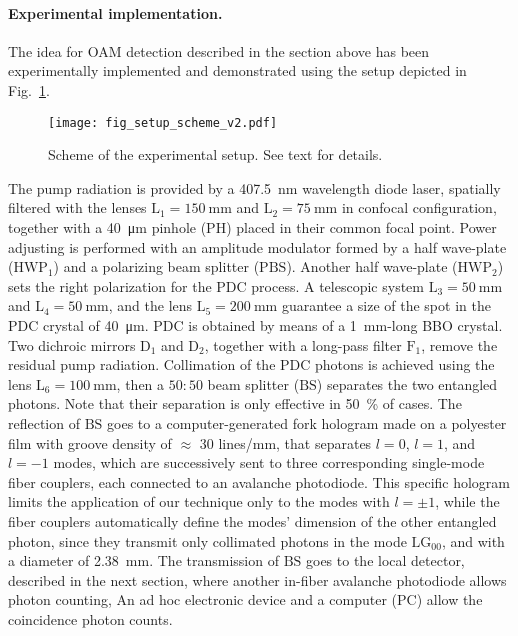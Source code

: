 \documentclass[
reprint,
amsmath,amssymb,
aps,
showkeys
]{revtex4-2}
\begin{document}
\paragraph*{\label{sec:experiment} Experimental implementation.}
The idea for OAM detection described in the section above has been experimentally implemented and demonstrated using the setup depicted in Fig.~\ref{fig:setup}.
%
\begin{figure}
\texttt{[image: fig\_setup\_scheme\_v2.pdf]}
\caption{Scheme of the experimental setup.
See text for details.}
\label{fig:setup}
\end{figure}
%
The pump radiation is provided by a \SI{407.5}{\nano\meter} wavelength diode laser, spatially filtered with the lenses $\mathrm{L}_1 = \SI{150}{\milli\meter}$ and $\mathrm{L}_2 = \SI{75}{\milli\meter}$ in confocal configuration, together with a \SI{40}{\micro\meter} pinhole ($\mathrm{PH}$) placed in their common focal point.
Power adjusting is performed with an amplitude modulator formed by a half wave-plate ($\mathrm{HWP}_1$) and a polarizing beam splitter ($\mathrm{PBS}$).
Another half wave-plate ($\mathrm{HWP}_2$) sets the right polarization for the PDC process.
A telescopic system $\mathrm{L}_3 = \SI{50}{\milli\meter}$ and $\mathrm{L}_4 = \SI{50}{\milli\meter}$, and the lens $\mathrm{L}_5 = \SI{200}{\milli\meter}$ guarantee a size of the spot in the PDC crystal of \SI{40}{\micro\meter}.
PDC is obtained by means of a \SI{1}{\milli\meter}-long BBO crystal.
Two dichroic mirrors $\mathrm{D}_1$ and $\mathrm{D}_2$, together with a long-pass filter $\mathrm{F}_1$, remove the residual pump radiation.
Collimation of the PDC photons is achieved using the lens $\mathrm{L}_6 = \SI{100}{\milli\meter}$, then a $50\!:\!50$ beam splitter ($\mathrm{BS}$) separates the two entangled photons.
Note that their separation is only effective in \SI{50}{\percent} of cases.
The reflection of $\mathrm{BS}$ goes to a computer-generated fork hologram made on a polyester film with groove density of $\approx$ 30 lines/mm, that separates $l=0$, $l=1$, and $l=-1$ modes, which are successively sent to three corresponding single-mode fiber couplers, each connected to an avalanche photodiode.
This specific hologram limits the application of our technique only to the modes with $l=\pm 1$, while the fiber couplers automatically define the modes' dimension of the other entangled photon, since they transmit only collimated photons in the mode $\mathrm{LG}_{00}$, and with a diameter of \SI{2.38}{\milli\meter}.
The transmission of $\mathrm{BS}$ goes to the local detector, described in the next section, where another in-fiber avalanche photodiode allows photon counting,
An ad hoc electronic device and a computer ($\mathrm{PC}$) allow the coincidence photon counts.
\end{document}
